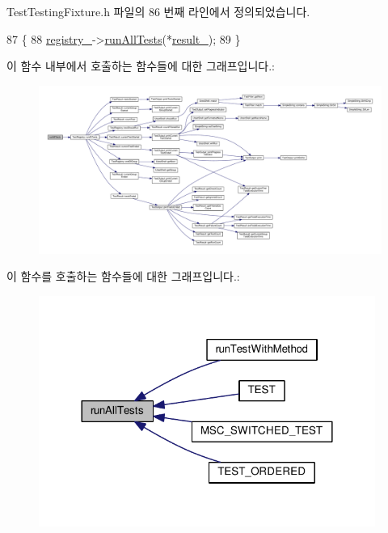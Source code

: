 Test\+Testing\+Fixture.\+h 파일의 86 번째 라인에서 정의되었습니다.


\begin{DoxyCode}
87     \{
88         \hyperlink{class_test_testing_fixture_a06daa3d9c1f367883447738388bd760d}{registry\_}->\hyperlink{class_test_registry_a881163eeadeeab81d09963bec459b437}{runAllTests}(*\hyperlink{class_test_testing_fixture_acf81b99797e96c7d602ffc4c3cb012b0}{result\_});
89     \}
\end{DoxyCode}


이 함수 내부에서 호출하는 함수들에 대한 그래프입니다.\+:
\nopagebreak
\begin{figure}[H]
\begin{center}
\leavevmode
\includegraphics[width=350pt]{class_test_testing_fixture_a3702737cbcdf9e878580a28c05a15a15_cgraph}
\end{center}
\end{figure}




이 함수를 호출하는 함수들에 대한 그래프입니다.\+:
\nopagebreak
\begin{figure}[H]
\begin{center}
\leavevmode
\includegraphics[width=312pt]{class_test_testing_fixture_a3702737cbcdf9e878580a28c05a15a15_icgraph}
\end{center}
\end{figure}


